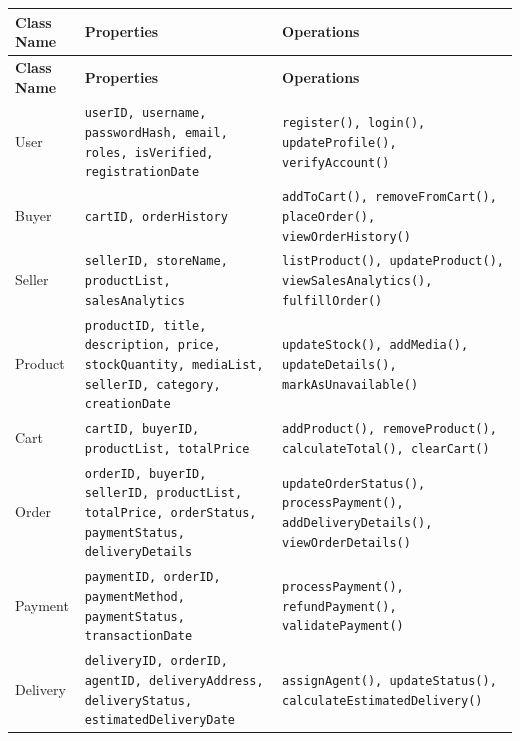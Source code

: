 \documentclass[12pt]{report}
\begin{document}
\begin{longtable}[H]{|l|p{5cm}|p{6.5cm}||}
	\hline
	\textbf{Class Name} & \textbf{Properties}                                                                                       & \textbf{Operations}                                                                      \\
	\hline
	\endfirsthead
	\hline
	\textbf{Class Name} & \textbf{Properties}                                                                                       & \textbf{Operations}                                                                      \\
	\hline
	\endhead
	User                & \texttt{userID, username, passwordHash, email, roles, isVerified, registrationDate}                       & \texttt{register(), login(), updateProfile(), verifyAccount()}                           \\
	\hline
	Buyer               & \texttt{cartID, orderHistory}                                                                             & \texttt{addToCart(), removeFromCart(), placeOrder(), viewOrderHistory()}                 \\
	\hline
	Seller              & \texttt{sellerID, storeName, productList, salesAnalytics}                                                 & \texttt{listProduct(), updateProduct(), viewSalesAnalytics(), fulfillOrder()}            \\
	\hline
	Product             & \texttt{productID, title, description, price, stockQuantity, mediaList, sellerID, category, creationDate} & \texttt{updateStock(), addMedia(), updateDetails(), markAsUnavailable()}                 \\
	\hline
	Cart                & \texttt{cartID, buyerID, productList, totalPrice}                                                         & \texttt{addProduct(), removeProduct(), calculateTotal(), clearCart()}                    \\
	\hline
	Order               & \texttt{orderID, buyerID, sellerID, productList, totalPrice, orderStatus, paymentStatus, deliveryDetails} & \texttt{updateOrderStatus(), processPayment(), addDeliveryDetails(), viewOrderDetails()} \\
	\hline
	Payment             & \texttt{paymentID, orderID, paymentMethod, paymentStatus, transactionDate}                                & \texttt{processPayment(), refundPayment(), validatePayment()}                            \\
	\hline
	Delivery            & \texttt{deliveryID, orderID, agentID, deliveryAddress, deliveryStatus, estimatedDeliveryDate}             & \texttt{assignAgent(), updateStatus(), calculateEstimatedDelivery()}                     \\

\end{longtable}
\end{document}
